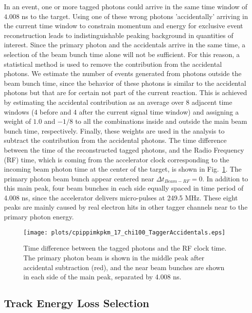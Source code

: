 In an event, one or more tagged photons could arrive in the same time window of $4.008$ ns to the target. Using one of these wrong photons 'accidentally' arriving in the current time window to constrain momentum and energy for exclusive event reconstruction leads to indistinguishable peaking background in quantities of interest. Since the primary photon and the accidentals arrive in the same time, a selection of the beam bunch time alone will not be sufficient. For this reason, a statistical method is used to remove the contribution from the accidental photons. We estimate the number of events generated from photons outside the beam bunch time, since the behavior of these photons is similar to the accidental photons but that are for certain not part of the current reaction. This is achieved by estimating the accidental contribution as an average over 8 adjacent time windows (4 before and 4 after the current signal time window) and assigning a weight of $1.0$ and $-1/8$ to all the combinations inside and outside the main beam bunch time, respectively. Finally, these weights are used in the analysis to subtract the contribution from the accidental photons. The time difference between the time of the reconstructed tagged photons, and the Radio Frequency (RF) time, which is coming from the accelerator clock corresponding to the incoming beam photon time at the center of the target, is shown in Fig.~\ref{fig.sec.evt_sel.bea_pho_acc_sub}. The primary photon beam bunch appear centered near $\Delta t_{Beam-RF} = 0$. In addition to this main peak, four beam bunches in each side equally spaced in time period of 4.008 ns, since the accelerator delivers micro-pulses at 249.5 MHz. These eight peaks are mainly caused by real electron hits in other tagger channels near to the primary photon energy.

\begin{figure}[H]
    \centering
        \texttt{[image: plots/cpippimkpkm\_17\_chi100\_TaggerAccidentals.eps]}
        \caption{Time difference between the tagged photons and the RF clock time. The primary photon beam is shown in the middle peak after accidental subtraction (red), and the near beam bunches are shown in each side of the main peak, separated by 4.008 ns.}
        \label{fig.sec.evt_sel.bea_pho_acc_sub}
\end{figure}

\subsection{Track Energy Loss Selection}
\label{sec.evt_sel.pid_dedx_sel}

